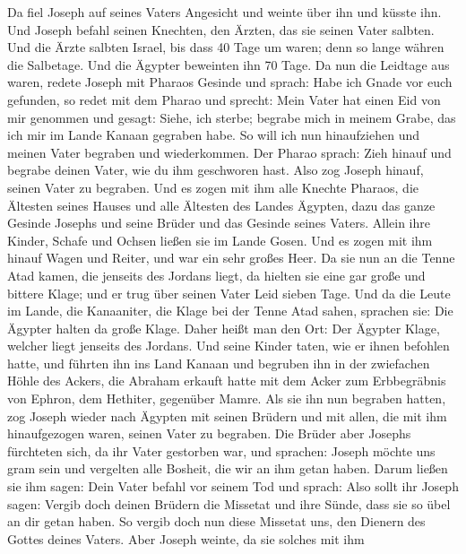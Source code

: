  Da fiel Joseph auf seines Vaters Angesicht und weinte
über ihn und küsste ihn.  Und Joseph befahl seinen
Knechten, den Ärzten, das sie seinen Vater salbten. Und die Ärzte
salbten Israel,  bis dass 40 Tage um waren; denn so lange
währen die Salbetage. Und die Ägypter beweinten ihn 70 Tage.
 Da nun die Leidtage aus waren, redete Joseph mit Pharaos
Gesinde und sprach: Habe ich Gnade vor euch gefunden, so redet mit dem
Pharao und sprecht:  Mein Vater hat einen Eid von mir
genommen und gesagt: Siehe, ich sterbe; begrabe mich in meinem Grabe,
das ich mir im Lande Kanaan gegraben habe. So will ich nun hinaufziehen
und meinen Vater begraben und wiederkommen.  Der Pharao
sprach: Zieh hinauf und begrabe deinen Vater, wie du ihm geschworen
hast.  Also zog Joseph hinauf, seinen Vater zu begraben.
Und es zogen mit ihm alle Knechte Pharaos, die Ältesten seines Hauses
und alle Ältesten des Landes Ägypten,  dazu das ganze
Gesinde Josephs und seine Brüder und das Gesinde seines Vaters. Allein
ihre Kinder, Schafe und Ochsen ließen sie im Lande Gosen. 
Und es zogen mit ihm hinauf Wagen und Reiter, und war ein sehr großes
Heer.  Da sie nun an die Tenne Atad kamen, die jenseits
des Jordans liegt, da hielten sie eine gar große und bittere Klage; und
er trug über seinen Vater Leid sieben Tage.  Und da die
Leute im Lande, die Kanaaniter, die Klage bei der Tenne Atad sahen,
sprachen sie: Die Ägypter halten da große Klage. Daher heißt man den
Ort: Der Ägypter Klage, welcher liegt jenseits des Jordans.
 Und seine Kinder taten, wie er ihnen befohlen hatte,
 und führten ihn ins Land Kanaan und begruben ihn in der
zwiefachen Höhle des Ackers, die Abraham erkauft hatte mit dem Acker zum
Erbbegräbnis von Ephron, dem Hethiter, gegenüber Mamre. 
Als sie ihn nun begraben hatten, zog Joseph wieder nach Ägypten mit
seinen Brüdern und mit allen, die mit ihm hinaufgezogen waren, seinen
Vater zu begraben.  Die Brüder aber Josephs fürchteten
sich, da ihr Vater gestorben war, und sprachen: Joseph möchte uns gram
sein und vergelten alle Bosheit, die wir an ihm getan haben.
 Darum ließen sie ihm sagen: Dein Vater befahl vor seinem
Tod und sprach:  Also sollt ihr Joseph sagen: Vergib doch
deinen Brüdern die Missetat und ihre Sünde, dass sie so übel an dir
getan haben. So vergib doch nun diese Missetat uns, den Dienern des
Gottes deines Vaters. Aber Joseph weinte, da sie solches mit ihm
